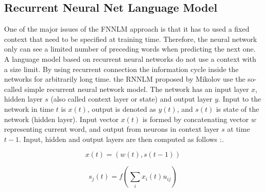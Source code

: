 


\subsection{Recurrent Neural Net Language Model}

One of the major issues of the \ac{FNNLM} approach is that
it has to used a fixed context that need to be specified at training time.
Therefore, the neural network only can see a limited number of preceding
words when predicting the next one.  A language model based on recurrent neural networks  do not use a context
with a size limit.  By using recurrent connection the information cycle
inside the networks for arbitrarily long time. the \ac{RNNLM} proposed by
Mikolov use the so-called simple
recurrent neural network model. The network has an input layer $x$, hidden
layer $s$ (also called context layer or state) and output layer $y$. Input to
the network in time $t$ is $x(t)$, output is denoted as $y(t)$, and $s(t)$ is
state of the network (hidden layer). Input vector $x(t)$ is formed by
concatenating vector $w$ representing current word, and output from neurons in
context layer $s$ at time $t - 1$. Input, hidden and output layers are then
computed as follows \cite{conf/interspeech/MikolovKBCK10}:.

\begin{equation} x(t) = (w(t), s(t-1))  \end{equation} 

\begin{equation} s_j(t) = f \left( \sum_{i}{x_i(t)u_{ij}}
  \right)   \end{equation}

